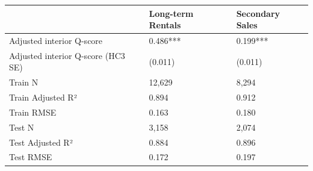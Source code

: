 \begin{tabular}{lll}
\toprule
 & Long-term Rentals & Secondary Sales \\
\midrule
Adjusted interior Q-score & 0.486*** & 0.199*** \\
Adjusted interior Q-score (HC3 SE) & (0.011) & (0.011) \\
Train N & 12,629 & 8,294 \\
Train Adjusted R² & 0.894 & 0.912 \\
Train RMSE & 0.163 & 0.180 \\
Test N & 3,158 & 2,074 \\
Test Adjusted R² & 0.884 & 0.896 \\
Test RMSE & 0.172 & 0.197 \\
\bottomrule
\end{tabular}

